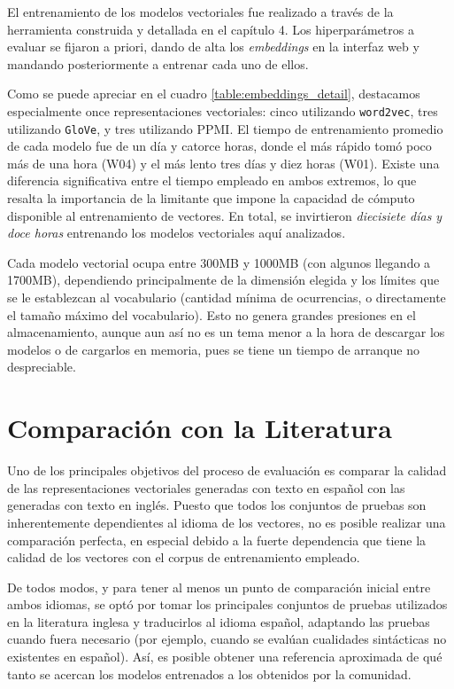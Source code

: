 El entrenamiento de los modelos vectoriales fue realizado a través de la herramienta construida y
detallada en el capítulo 4. Los hiperparámetros a evaluar se fijaron a priori, dando de alta los
\textit{embeddings} en la interfaz web y mandando posteriormente a entrenar cada uno de ellos.

Como se puede apreciar en el cuadro \ref{table:embeddings_detail}, destacamos especialmente once
representaciones vectoriales: cinco utilizando \texttt{word2vec}, tres utilizando \texttt{GloVe}, y
tres utilizando PPMI\@. El tiempo de entrenamiento promedio de cada modelo fue de un día y catorce
horas, donde el más rápido tomó poco más de una hora (W04) y el más lento tres días y diez horas
(W01). Existe una diferencia significativa entre el tiempo empleado en ambos extremos, lo que
resalta la importancia de la limitante que impone la capacidad de cómputo disponible al
entrenamiento de vectores. En total, se invirtieron \textit{diecisiete días y doce horas} entrenando
los modelos vectoriales aquí analizados.

Cada modelo vectorial ocupa entre 300MB y 1000MB (con algunos llegando a 1700MB), dependiendo
principalmente de la dimensión elegida y los límites que se le establezcan al vocabulario (cantidad
mínima de ocurrencias, o directamente el tamaño máximo del vocabulario). Esto no genera grandes
presiones en el almacenamiento, aunque aun así no es un tema menor a la hora de descargar los
modelos o de cargarlos en memoria, pues se tiene un tiempo de arranque no despreciable.


\section{Comparación con la Literatura}

Uno de los principales objetivos del proceso de evaluación es comparar la calidad de las
representaciones vectoriales generadas con texto en español con las generadas con texto en
inglés. Puesto que todos los conjuntos de pruebas son inherentemente dependientes al idioma de los
vectores, no es posible realizar una comparación perfecta, en especial debido a la fuerte
dependencia que tiene la calidad de los vectores con el corpus de entrenamiento empleado.

De todos modos, y para tener al menos un punto de comparación inicial entre ambos idiomas, se optó
por tomar los principales conjuntos de pruebas utilizados en la literatura inglesa y traducirlos al
idioma español, adaptando las pruebas cuando fuera necesario (por ejemplo, cuando se evalúan
cualidades sintácticas no existentes en español). Así, es posible obtener una referencia aproximada
de qué tanto se acercan los modelos entrenados a los obtenidos por la comunidad.


